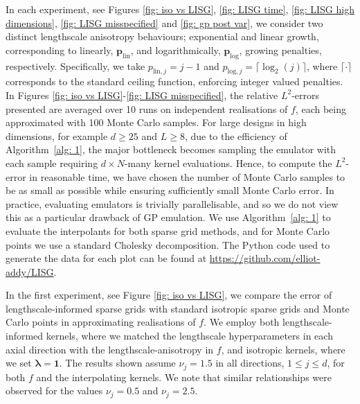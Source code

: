\documentclass[pdflatex,sn-mathphys-num]{sn-jnl}%
\theoremstyle{thmstyleone}%
\theoremstyle{thmstyletwo}%
\theoremstyle{thmstylethree}%
\begin{document}
In each experiment, see Figures \ref{fig: iso vs LISG}, \ref{fig: LISG time}, \ref{fig: LISG high dimensions}, \ref{fig: LISG misspecified} and \ref{fig: gp post var}, we consider two distinct lengthscale anisotropy behaviours; exponential and linear growth, corresponding to linearly, \(\mathbf{p}_{\textrm{lin}}\), and logarithmically, \(\mathbf{p}_{\textrm{log}}\), growing penalties, respectively. Specifically, we take \(p_{\textrm{lin},j}=j-1\) and \(p_{\textrm{log},j} = \lceil\log_2(j)\rceil\), where \(\lceil\cdot\rceil\) corresponds to the standard ceiling function, enforcing integer valued penalties. In Figures \ref{fig: iso vs LISG}-\ref{fig: LISG misspecified}, the relative \(L^2\)-errors presented are averaged over 10 runs on independent realisations of \(f\), each being approximated with 100 Monte Carlo samples. For large designs in high dimensions, for example \(d\geq25\) and \(L\geq8\), due to the efficiency of Algorithm~\ref{alg: 1}, the major bottleneck becomes sampling the emulator with each sample requiring \(d\times N\)-many kernel evaluations. Hence, to compute the $L^2$-error in  reasonable time, we have chosen the number of Monte Carlo samples to be as small as possible while ensuring sufficiently small Monte Carlo error. In practice, evaluating emulators is trivially parallelisable, and so we do not view this as a particular drawback of GP emulation. We use Algorithm~\ref{alg: 1} to evaluate the interpolants for both sparse grid methods, and for Monte Carlo points we use a standard Cholesky decomposition. The Python code used to generate the data for each plot can be found at \url{https://github.com/elliot-addy/LISG}.

In the first experiment, see Figure \ref{fig: iso vs LISG}, we compare the error of lengthscale-informed sparse grids with standard isotropic sparse grids and Monte Carlo points in approximating realisations of \(f\). We employ both lengthscale-informed kernels, where we matched the lengthscale hyperparameters in each axial direction with the lengthscale-anisotropy in \(f\), and isotropic kernels, where we set \(\boldsymbol{\lambda}=\mathbf{1}\). The results shown assume \(\nu_j=1.5\) in all directions, \(1\leq j\leq d\), for both \(f\) and the interpolating kernels. We note that similar relationships were observed for the values \(\nu_j=0.5\) and \(\nu_j=2.5\). 
\end{document}
